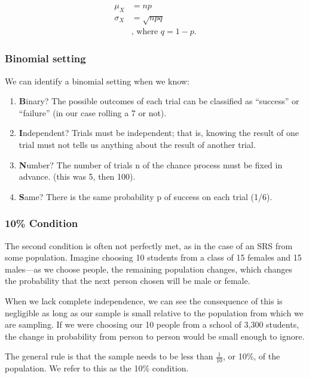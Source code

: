 \documentclass[
]{book}
\theoremstyle{definition}
\theoremstyle{definition}
\theoremstyle{definition}
\theoremstyle{definition}
\theoremstyle{remark}
\begin{document}
\[
\begin{aligned}
    \mu_X &= n p \\
    \sigma_X &= \sqrt{n p q} \\
    &\text{, where } q = 1-p.
\end{aligned}
\]

\hypertarget{binomial-setting}{%
\subsubsection{Binomial setting}\label{binomial-setting}}

We can identify a binomial setting when we know:

\begin{enumerate}
\def\labelenumi{\arabic{enumi}.}
\item
  \textbf{B}inary? The possible outcomes of each trial can be classified as
  ``success'' or ``failure'' (in our case rolling a 7 or not).
\item
  \textbf{I}ndependent? Trials must be independent; that is, knowing the
  result of one trial must not tells us anything about the result of
  another trial.
\item
  \textbf{N}umber? The number of trials n of the chance process must be
  fixed in advance. (this was 5, then 100).
\item
  \textbf{S}ame? There is the same probability p of success on each trial
  (1/6).
\end{enumerate}

\hypertarget{condition}{%
\subsubsection{10\% Condition}\label{condition}}

The second condition is often not perfectly met, as in the case of an
SRS from some population. Imagine choosing 10 students from a class of
15 females and 15 males---as we choose people, the remaining population
changes, which changes the probability that the next person chosen will
be male or female.

When we lack complete independence, we can see the consequence of this
is negligible as long as our sample is small relative to the population
from which we are sampling. If we were choosing our 10 people from a
school of 3,300 students, the change in probability from person to
person would be small enough to ignore.

The general rule is that the sample needs to be less than
\(\frac{1}{10}\), or 10\%, of the population. We refer to this as the 10\%
condition.
\end{document}
